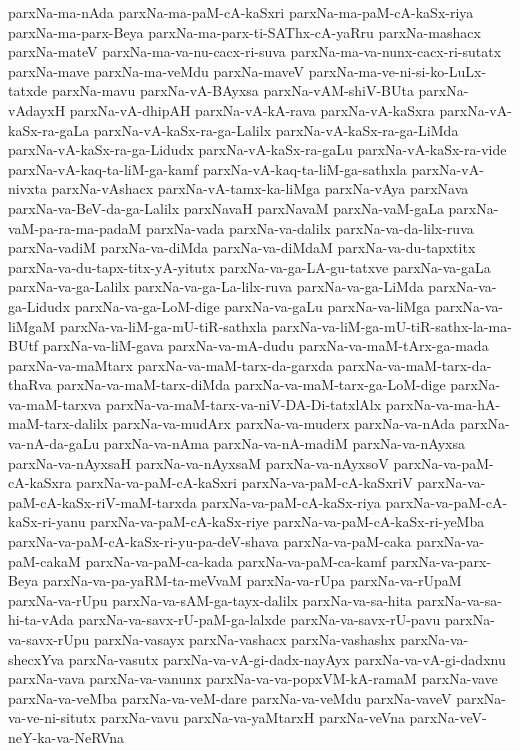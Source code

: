 {parxNa-ma-nAda
parxNa-ma-paM-cA-kaSxri
parxNa-ma-paM-cA-kaSx-riya
parxNa-ma-parx-Beya
parxNa-ma-parx-ti-SAThx-cA-yaRru
parxNa-mashacx
parxNa-mateV
parxNa-ma-va-nu-cacx-ri-suva
parxNa-ma-va-nunx-cacx-ri-sutatx
parxNa-mave
parxNa-ma-veMdu
parxNa-maveV
parxNa-ma-ve-ni-si-ko-LuLx-tatxde
parxNa-mavu
parxNa-vA-BAyxsa
parxNa-vAM-shiV-BUta
parxNa-vAdayxH
parxNa-vA-dhipAH
parxNa-vA-kA-rava
parxNa-vA-kaSxra
parxNa-vA-kaSx-ra-gaLa
parxNa-vA-kaSx-ra-ga-Lalilx
parxNa-vA-kaSx-ra-ga-LiMda
parxNa-vA-kaSx-ra-ga-Lidudx
parxNa-vA-kaSx-ra-gaLu
parxNa-vA-kaSx-ra-vide
parxNa-vA-kaq-ta-liM-ga-kamf
parxNa-vA-kaq-ta-liM-ga-sathxla
parxNa-vA-nivxta
parxNa-vAshacx
parxNa-vA-tamx-ka-liMga
parxNa-vAya
parxNava
parxNa-va-BeV-da-ga-Lalilx
parxNavaH
parxNavaM
parxNa-vaM-gaLa
parxNa-vaM-pa-ra-ma-padaM
parxNa-vada
parxNa-va-dalilx
parxNa-va-da-lilx-ruva
parxNa-vadiM
parxNa-va-diMda
parxNa-va-diMdaM
parxNa-va-du-tapxtitx
parxNa-va-du-tapx-titx-yA-yitutx
parxNa-va-ga-LA-gu-tatxve
parxNa-va-gaLa
parxNa-va-ga-Lalilx
parxNa-va-ga-La-lilx-ruva
parxNa-va-ga-LiMda
parxNa-va-ga-Lidudx
parxNa-va-ga-LoM-dige
parxNa-va-gaLu
parxNa-va-liMga
parxNa-va-liMgaM
parxNa-va-liM-ga-mU-tiR-sathxla
parxNa-va-liM-ga-mU-tiR-sathx-la-ma-BUtf
parxNa-va-liM-gava
parxNa-va-mA-dudu
parxNa-va-maM-tArx-ga-mada
parxNa-va-maMtarx
parxNa-va-maM-tarx-da-garxda
parxNa-va-maM-tarx-da-thaRva
parxNa-va-maM-tarx-diMda
parxNa-va-maM-tarx-ga-LoM-dige
parxNa-va-maM-tarxva
parxNa-va-maM-tarx-va-niV-DA-Di-tatxlAlx
parxNa-va-ma-hA-maM-tarx-dalilx
parxNa-va-mudArx
parxNa-va-muderx
parxNa-va-nAda
parxNa-va-nA-da-gaLu
parxNa-va-nAma
parxNa-va-nA-madiM
parxNa-va-nAyxsa
parxNa-va-nAyxsaH
parxNa-va-nAyxsaM
parxNa-va-nAyxsoV
parxNa-va-paM-cA-kaSxra
parxNa-va-paM-cA-kaSxri
parxNa-va-paM-cA-kaSxriV
parxNa-va-paM-cA-kaSx-riV-maM-tarxda
parxNa-va-paM-cA-kaSx-riya
parxNa-va-paM-cA-kaSx-ri-yanu
parxNa-va-paM-cA-kaSx-riye
parxNa-va-paM-cA-kaSx-ri-yeMba
parxNa-va-paM-cA-kaSx-ri-yu-pa-deV-shava
parxNa-va-paM-caka
parxNa-va-paM-cakaM
parxNa-va-paM-ca-kada
parxNa-va-paM-ca-kamf
parxNa-va-parx-Beya
parxNa-va-pa-yaRM-ta-meVvaM
parxNa-va-rUpa
parxNa-va-rUpaM
parxNa-va-rUpu
parxNa-va-sAM-ga-tayx-dalilx
parxNa-va-sa-hita
parxNa-va-sa-hi-ta-vAda
parxNa-va-savx-rU-paM-ga-lalxde
parxNa-va-savx-rU-pavu
parxNa-va-savx-rUpu
parxNa-vasayx
parxNa-vashacx
parxNa-vashashx
parxNa-va-shecxYva
parxNa-vasutx
parxNa-va-vA-gi-dadx-nayAyx
parxNa-va-vA-gi-dadxnu
parxNa-vava
parxNa-va-vanunx
parxNa-va-va-popxVM-kA-ramaM
parxNa-vave
parxNa-va-veMba
parxNa-va-veM-dare
parxNa-va-veMdu
parxNa-vaveV
parxNa-va-ve-ni-situtx
parxNa-vavu
parxNa-va-yaMtarxH
parxNa-veVna
parxNa-veV-neY-ka-va-NeRVna
}
